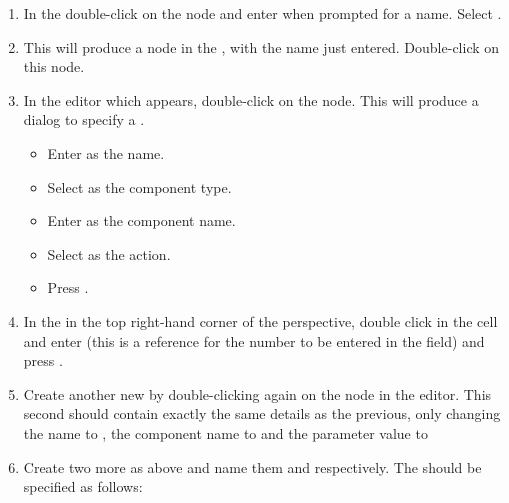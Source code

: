 \begin{enumerate}
 \item In the \gdtestcasebrowser{} double-click on the 
 node
and enter  
when prompted for a name. Select .
\item This will produce a \gdcase node in the  \gdtestcasebrowser{}, with the
name just entered. Double-click on this node. 
\item In the editor which appears, double-click on the
  node. 
This will produce a dialog to specify a \gdstep{}. 
\begin{itemize}
\item Enter  as the name.
\item Select  as the component type.
\item Enter  as the component name.
\item Select  as the action.
\item Press .
\end{itemize}
\item In the \gdpropview{} in the top right-hand corner of the perspective, double click in the  cell and 
 enter  (this is a reference for the number to be  entered in
the field) and press .
\item Create another
 new \gdstep by double-clicking again on the  node in the 
editor. This second 
\gdstep should contain  exactly the same details as the previous,
 only changing the \gdstep name to , the
component name to  and the parameter value to 
\item Create two more \gdsteps as above and name them  and 
 respectively. The \gdsteps should be specified as follows:


\end{enumerate}
